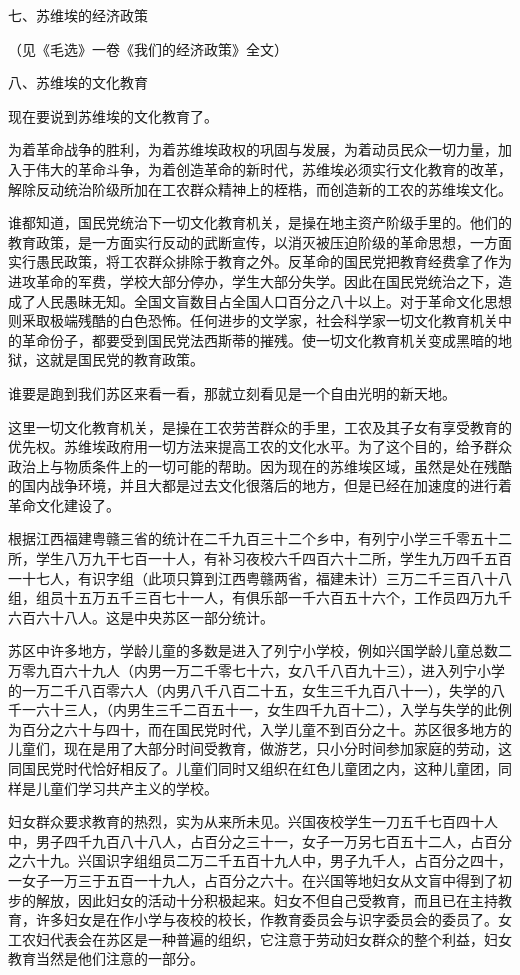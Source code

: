 七、苏维埃的经济政策

（见《毛选》一卷《我们的经济政策》全文）

八、苏维埃的文化教育

现在要说到苏维埃的文化教育了。

为着革命战争的胜利，为着苏维埃政权的巩固与发展，为着动员民众一切力量，加入于伟大的革命斗争，为着创造革命的新时代，苏维埃必须实行文化教育的改革，解除反动统治阶级所加在工农群众精神上的桎梏，而创造新的工农的苏维埃文化。

谁都知道，国民党统治下一切文化教育机关，是操在地主资产阶级手里的。他们的教育政策，是一方面实行反动的武断宣传，以消灭被压迫阶级的革命思想，一方面实行愚民政策，将工农群众排除于教育之外。反革命的国民党把教育经费拿了作为进攻革命的军费，学校大部分停办，学生大部分失学。因此在国民党统治之下，造成了人民愚昧无知。全国文盲数目占全国人口百分之八十以上。对于革命文化思想则釆取极端残酷的白色恐怖。任何进步的文学家，社会科学家一切文化教育机关中的革命份子，都要受到国民党法西斯蒂的摧残。使一切文化教育机关变成黑暗的地狱，这就是国民党的教育政策。

谁要是跑到我们苏区来看一看，那就立刻看见是一个自由光明的新天地。

这里一切文化教育机关，是操在工农劳苦群众的手里，工农及其子女有享受教育的优先权。苏维埃政府用一切方法来提高工农的文化水平。为了这个目的，给予群众政治上与物质条件上的一切可能的帮助。因为现在的苏维埃区域，虽然是处在残酷的国内战争环境，并且大都是过去文化很落后的地方，但是已经在加速度的进行着革命文化建设了。

根据江西福建粤赣三省的统计在二千九百三十二个乡中，有列宁小学三千零五十二所，学生八万九干七百一十人，有补习夜校六千四百六十二所，学生九万四千五百一十七人，有识字组（此项只算到江西粤赣两省，福建未计）三万二千三百八十八组，组员十五万五千三百七十一人，有俱乐部一千六百五十六个，工作员四万九千六百六十八人。这是中央苏区一部分统计。

苏区中许多地方，学龄儿童的多数是进入了列宁小学校，例如兴国学龄儿童总数二万零九百六十九人（内男一万二千零七十六，女八千八百九十三），进入列宁小学的一万二千八百零六人（内男八千八百二十五，女生三千九百八十一），失学的八千一六十三人，（内男生三千二百五十一，女生四千九百十二），入学与失学的此例为百分之六十与四十，而在国民党时代，入学儿童不到百分之十。苏区很多地方的儿童们，现在是用了大部分时间受教育，做游艺，只小分时间参加家庭的劳动，这同国民党时代恰好相反了。儿童们同时又组织在红色儿童团之内，这种儿童团，同样是儿童们学习共产主义的学校。

妇女群众要求教育的热烈，实为从来所未见。兴国夜校学生一刀五千七百四十人中，男子四千九百八十八人，占百分之三十一，女子一万另七百五十二人，占百分之六十九。兴国识字组组员二万二千五百十九人中，男子九千人，占百分之四十，一女子一万三于五百一十九人，占百分之六十。在兴国等地妇女从文盲中得到了初步的解放，因此妇女的活动十分积极起来。妇女不但自己受教育，而且已在主持教育，许多妇女是在作小学与夜校的校长，作教育委员会与识字委员会的委员了。女工农妇代表会在苏区是一种普遍的组织，它注意于劳动妇女群众的整个利益，妇女教育当然是他们注意的一部分。

